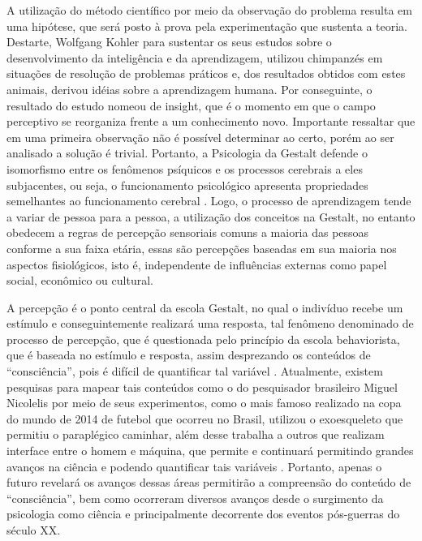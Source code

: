 A utilização do método científico por meio da observação do problema resulta em uma hipótese, que será posto à prova pela experimentação que sustenta a teoria. 
Destarte, Wolfgang Kohler para sustentar os seus estudos sobre o desenvolvimento da inteligência e da
aprendizagem, utilizou chimpanzés em situações de resolução de problemas práticos e, dos resultados obtidos com estes animais, derivou idéias sobre a aprendizagem humana. 
Por conseguinte, o resultado do estudo nomeou de insight, que é o momento em que o campo perceptivo se reorganiza frente a um conhecimento novo. 
Importante ressaltar que em uma primeira observação não é possível determinar ao certo, porém ao ser analisado a solução é trivial.
Portanto, a Psicologia da Gestalt defende o isomorfismo entre os fenômenos psíquicos e os
processos cerebrais a eles subjacentes, ou seja, o funcionamento psicológico apresenta propriedades semelhantes ao funcionamento cerebral \cite{silva2007psicologia_educacao}. 
Logo, o processo de aprendizagem tende a variar de pessoa para a pessoa, a utilização dos
conceitos na Gestalt, no entanto obedecem a regras de percepção sensoriais comuns a maioria das pessoas conforme a sua faixa etária, essas são percepções baseadas em sua maioria nos aspectos fisiológicos, isto é, independente de influências externas como papel social, econômico ou cultural.

A percepção é o ponto central da escola Gestalt, no qual o indivíduo recebe um estímulo e conseguintemente realizará uma resposta, tal fenômeno denominado de processo de percepção, que é questionada pelo princípio da escola behaviorista, que é baseada no estímulo e resposta, assim desprezando os conteúdos de ``consciência'', pois é difícil de quantificar tal variável \cite{bock1999psicologias}.
Atualmente, existem pesquisas para mapear tais conteúdos como o do pesquisador brasileiro Miguel Nicolelis por meio de seus experimentos, como o mais famoso realizado na copa do mundo de 2014 de futebol que ocorreu no Brasil, utilizou o exoesqueleto que permitiu o paraplégico caminhar, além desse trabalha a outros que realizam interface entre o homem e máquina, que permite e continuará permitindo grandes avanços na ciência e podendo quantificar tais variáveis \cite{nicolelis2015cerebro,nicolelis2020true}.
Portanto, apenas o futuro revelará os avanços dessas áreas permitirão a compreensão do conteúdo de ``consciência'', bem como ocorreram diversos avanços desde o surgimento da psicologia como ciência e principalmente decorrente dos eventos pós-guerras do século XX.
